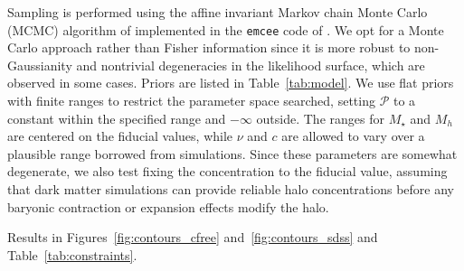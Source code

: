\documentclass[12pt]{emulateapj}
\begin{document}
Sampling is performed using the
affine invariant Markov chain Monte Carlo (MCMC) algorithm of
\citet{Goodman2010} implemented in the {\tt emcee} code of
\citet{Foreman-Mackey2013}. We opt for a Monte Carlo approach rather
than Fisher information since it is more robust to non-Gaussianity and
nontrivial degeneracies in the likelihood surface, which are observed
in some cases. Priors are listed in Table~\ref{tab:model}. We use flat
priors with finite ranges to restrict the parameter space
searched, setting ${\mathcal P}$ to a constant within the specified
range and $-\infty$ outside. The ranges for $M_{\star}$ and $M_h$ are centered on the
fiducial values, while $\nu$ and $c$ are allowed to vary over a
plausible range borrowed from simulations. Since these parameters are
somewhat degenerate, we also test fixing the concentration to the
fiducial value, assuming that dark matter simulations can provide
reliable halo concentrations before any baryonic contraction or
expansion effects modify the halo.

Results in Figures~\ref{fig:contours_cfree}
and~\ref{fig:contours_sdss} and Table~\ref{tab:constraints}. 

\begin{figure*}[htb]
\caption{Posterior distributions for model
  parameters from MCMC fit with the fiducial Cluster model, LSST survey
  parameters, $R_{\rm min}=20\,{\rm kpc}$, and $\Gamma=1.0$. Contraints are from $\Sigma(R)$ (red),
  $\Delta\Sigma(R)$ (green), and the combined data (blue). The top
  column in each panel shows the arbitrarily normalized one-dimensional posterior for each
  parameter while marginalizing over other parameters, and lower
  panels show the $68\%$ and $95\%$ contours of the joint posterior distribution
  for each pair of parameters. In this optimistic scenario, all four
  parameters are constrained by the data.}
\label{fig:contours_cfree}
\end{figure*}

\begin{figure*}[htb]
\caption{Same as Figure~\ref{fig:contours_cfree} but with SDSS survey parameters.}
\label{fig:contours_sdss}
\end{figure*}
\end{document}
